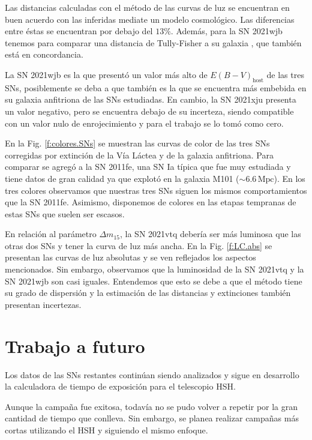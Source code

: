 \documentclass[baaa]{baaa}
\begin{document}
Las distancias calculadas con el método de las curvas de luz se encuentran en buen acuerdo con las inferidas mediate un modelo cosmológico. Las diferencias entre éstas se encuentran por debajo del $13 \%$. Además, para la SN 2021wjb tenemos para comparar una distancia de Tully-Fisher a su galaxia  \citep{1999.Dale}, que también está en concordancia.

La SN 2021wjb es la que presentó un valor más alto de $E(B-V)_\mathrm{host}$ de las tres SNs, posiblemente se deba a que también es la que se encuentra más embebida en su galaxia anfitriona de las SNs estudiadas. En cambio, la SN 2021xju presenta un valor negativo, pero se encuentra debajo de su incerteza, siendo compatible con un valor nulo de enrojecimiento y para el trabajo se lo tomó como cero.

En la Fig. \ref{f:colores.SNs} se muestran las curvas de color de las tres SNs corregidas por extinción de la Vía Láctea y de la galaxia anfitriona. Para comparar se agregó a la SN 2011fe, una SN Ia típica que fue muy estudiada y tiene datos de gran calidad ya que explotó en la galaxia M101 ($\sim 6.6 \, \mathrm{Mpc}$). En los tres colores observamos que nuestras tres SNs siguen los mismos comportamientos que la SN 2011fe. Asimismo, disponemos de colores en las etapas tempranas de estas SNs que suelen ser escasos.  

En relación al parámetro $\Delta m_{15}$, la SN 2021vtq debería ser más luminosa que las otras dos SNs y tener la curva de luz más ancha. En la Fig. \ref{f:LC.abs} se presentan las curvas de luz absolutas y se ven reflejados los aspectos mencionados. Sin embargo, observamos que la luminosidad de la SN 2021vtq y la SN 2021wjb son casi iguales. Entendemos que esto se debe a que el método tiene su grado de dispersión y la estimación de las distancias y extinciones también presentan incertezas. 
\section{Trabajo a futuro}

Los datos de las SNs restantes continúan siendo analizados y sigue en desarrollo la calculadora de tiempo de exposición para el telescopio HSH.

Aunque la campaña fue exitosa, todavía no se pudo volver a repetir por la gran cantidad de tiempo que conlleva. Sin embargo, se planea realizar campañas más cortas utilizando el HSH y siguiendo el mismo enfoque.



\small

\newpage
\newpage


\newpage
\end{document}
